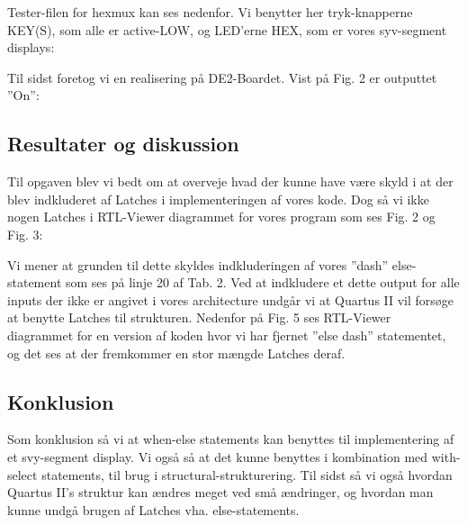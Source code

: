 \documentclass[../journal2.tex]{subfiles}
\begin{document}
Tester-filen for hex\textunderscore mux kan ses nedenfor. Vi benytter her tryk-knapperne KEY(S), som alle er active-LOW, og LED'erne HEX, som er vores syv-segment displays:

\begin{table}[H]
    \centering
      \framebox{
        \rule{8pt}{0pt}
          
  }
  \caption{Architecture af hex\textunderscore mux\textunderscore test}
  \label{src:hex_mux_arch_test}
\end{table}

Til sidst foretog vi en realisering på DE2-Boardet. Vist på Fig. 2 er outputtet ''On'':


\subsection{Resultater og diskussion}

Til opgaven blev vi bedt om at overveje hvad der kunne have være skyld i at der blev indkluderet af Latches i implementeringen af vores kode. Dog så vi ikke nogen Latches i RTL-Viewer diagrammet for vores program som ses Fig. 2 og Fig. 3:


Vi mener at grunden til dette skyldes indkluderingen af vores ''dash'' else-statement som ses på linje 20 af Tab. 2. Ved at indkludere et dette output for alle inputs der ikke er angivet i vores architecture undgår vi at Quartus II vil forsøge at benytte Latches til strukturen. Nedenfor på Fig. 5 ses RTL-Viewer diagrammet for en version af koden hvor vi har fjernet ''else dash'' statementet, og det ses at der fremkommer en stor mængde Latches deraf.


\subsection{Konklusion}

Som konklusion så vi at when-else statements kan benyttes til implementering af et svy-segment display. Vi også så at det kunne benyttes i kombination med with-select statements, til brug i structural-strukturering. Til sidst så vi også hvordan Quartus II's struktur kan ændres meget ved små ændringer, og hvordan man kunne undgå brugen af Latches vha. else-statements. 
\end{document}
